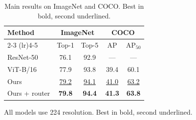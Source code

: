 \begin{table}[t]
\centering
\small
\caption{Main results on ImageNet and COCO. Best in bold, second underlined.}
\label{tab:main}
\begin{tabular}{lcccc}
\toprule
\multicolumn{1}{l}{Method} & \multicolumn{2}{c}{\textbf{ImageNet}} & \multicolumn{2}{c}{\textbf{COCO}} \\
\cmidrule(lr){2-3} \cmidrule(lr){4-5}
 & Top-1 & Top-5 & AP & AP$_{50}$ \\
\midrule
ResNet-50 & 76.1 & 92.9 & --- & --- \\
ViT-B/16 & 77.9 & 93.8 & 39.4 & 60.1 \\
Ours & \underline{79.2} & \underline{94.1} & \underline{41.0} & \underline{63.2} \\
Ours + router & \textbf{79.8} & \textbf{94.4} & \textbf{41.3} & \textbf{63.8} \\
\bottomrule
\end{tabular}
\par\smallskip\footnotesize All models use 224 resolution. Best in bold, second underlined.
\end{table}
